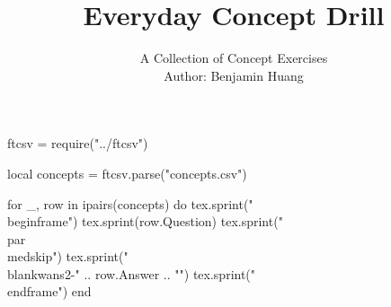 \documentclass[10pt, aspectratio=169]{beamer}
\author[B.H.]{{\Large A Collection of Concept Exercises}\\\vspace{.5em} Author: Benjamin Huang}
\date{}
\title[Concept Drill]{Everyday Concept Drill}
\newcommand{\blankwans}[3][.]{\alt<#2>{{\color{red}\uline{#3}}#1}{\hrulefill#1}}
\begin{document}
\huge
\begin{luacode*}
ftcsv = require("../ftcsv")

local concepts = ftcsv.parse("concepts.csv")

for _, row in ipairs(concepts) do
    tex.sprint("\\begin{frame}")
    tex.sprint(row.Question)
    tex.sprint("\\par\\medskip")
    tex.sprint("\\blankwans{2-}{" .. row.Answer .. "}")
    tex.sprint("\\end{frame}")
end
\end{luacode*}
\end{document}
